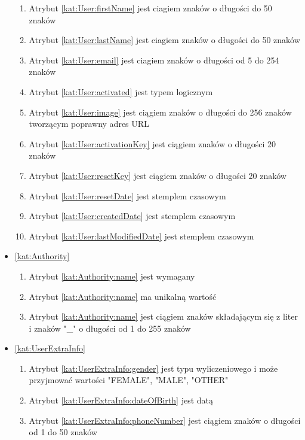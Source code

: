 \begin{itemize}[label={\textbf{Ograniczenia dla}}, wide, labelwidth=!, labelindent=0pt]
\begin{enumerate}[label={\textbf{OGR/\protect\threedigits{\arabic{enumi}}}}, wide, labelwidth=!, align=left, leftmargin=3cm, resume]
        \item Atrybut \ref{kat:User:firstName} jest ciagiem znaków o długości do 50 znaków
        \item Atrybut \ref{kat:User:lastName} jest ciagiem znaków o długości do 50 znaków
        \item Atrybut \ref{kat:User:email} jest ciagiem znaków o długości od 5 do 254 znaków
        \item Atrybut \ref{kat:User:activated} jest typem logicznym
        \item Atrybut \ref{kat:User:image} jest ciągiem znaków o długości do 256 znaków tworzącym poprawny adres URL
        \item Atrybut \ref{kat:User:activationKey} jest ciągiem znaków o długości 20 znaków
        \item Atrybut \ref{kat:User:resetKey} jest ciągiem znaków o długości 20 znaków
        \item Atrybut \ref{kat:User:resetDate} jest stemplem czasowym
        \item Atrybut \ref{kat:User:createdDate} jest stemplem czasowym
        \item Atrybut \ref{kat:User:lastModifiedDate} jest stemplem czasowym
    \end{enumerate}
    \item\ref{kat:Authority}
    \begin{enumerate}[label={\textbf{OGR/\protect\threedigits{\arabic{enumi}}}}, wide, labelwidth=!, align=left, leftmargin=3cm, resume]
        \item Atrybut \ref{kat:Authority:name} jest wymagany
        \item Atrybut \ref{kat:Authority:name} ma unikalną wartość
        \item Atrybut \ref{kat:Authority:name} jest ciągiem znaków składającym się z liter i znaków "\_" o długości od 1 do 255 znaków
    \end{enumerate}
    \item\ref{kat:UserExtraInfo}
    \begin{enumerate}[label={\textbf{OGR/\protect\threedigits{\arabic{enumi}}}}, wide, labelwidth=!, align=left, leftmargin=3cm, resume]
        \item Atrybut \ref{kat:UserExtraInfo:gender} jest typu wyliczeniowego i może przyjmować wartości "FEMALE", "MALE", "OTHER"
        \item Atrybut \ref{kat:UserExtraInfo:dateOfBirth} jest datą
        \item Atrybut \ref{kat:UserExtraInfo:phoneNumber} jest ciągiem znaków o długości od 1 do 50 znaków

\end{enumerate}
\end{itemize}
